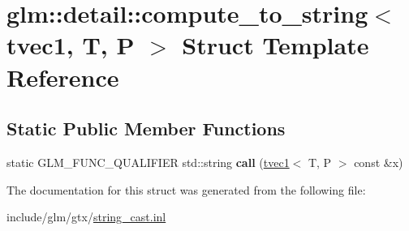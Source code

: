 \hypertarget{structglm_1_1detail_1_1compute__to__string_3_01tvec1_00_01T_00_01P_01_4}{}\section{glm\+:\+:detail\+:\+:compute\+\_\+to\+\_\+string$<$ tvec1, T, P $>$ Struct Template Reference}
\label{structglm_1_1detail_1_1compute__to__string_3_01tvec1_00_01T_00_01P_01_4}
\subsection*{Static Public Member Functions}
\begin{DoxyCompactItemize}
\item 
\mbox{\label{structglm_1_1detail_1_1compute__to__string_3_01tvec1_00_01T_00_01P_01_4_ae459fc0d0afddfc2f977012f95210bd2}} 
static G\+L\+M\+\_\+\+F\+U\+N\+C\+\_\+\+Q\+U\+A\+L\+I\+F\+I\+ER std\+::string {\bfseries call} (\hyperlink{structglm_1_1tvec1}{tvec1}$<$ T, P $>$ const \&x)
\end{DoxyCompactItemize}


The documentation for this struct was generated from the following file\+:\begin{DoxyCompactItemize}
\item 
include/glm/gtx/\hyperlink{string__cast_8inl}{string\+\_\+cast.\+inl}\end{DoxyCompactItemize}
